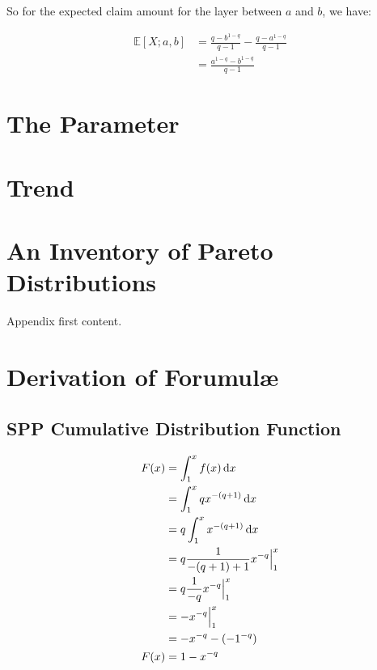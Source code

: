 \documentclass[]{article} %
\begin{document}
So for the expected claim amount for the layer between $a$ and $b$, we have:

\begin{align}
\mathbb{E}[X;a, b] &= \frac{q - b^{1-q}}{q-1} - \frac{q - a^{1-q}}{q-1} \\
&= \frac{a^{1-q} - b^{1-q}}{q-1}
\end{align}

\section{The Parameter}
\section{Trend}

\newpage
\appendix
\appendixpage

\section{An Inventory of Pareto Distributions}\label{ParetoInventory}
Appendix first content.
\section{Derivation of Forumul\ae}
\subsection{SPP Cumulative Distribution Function}\label{ParetoF}
\begin{align}
	F(x) &= \int_{1}^{x} f(x) \operatorname{d \!} x \nonumber\\
		&= \int_{1}^{x}qx^{-(q+1)} \operatorname{d \!} x\nonumber\\
		&= q \int_{1}^{x}x^{-(q+1)} \operatorname{d \!} x\nonumber\\
		&= q \frac{1}{-(q+1)+1} x^{-q} \Big|_{1}^{x}\nonumber\\
		&=  q \frac{1}{-q} x^{-q} \Big|_{1}^{x}\nonumber\\
		&=  - x^{-q}\Big|_{1}^{x}\nonumber\\
		&= -x^{-q} - (-1^{-q})\nonumber\\
	 F(x) &=  1 - x^{-q}
\end{align}
\end{document}
